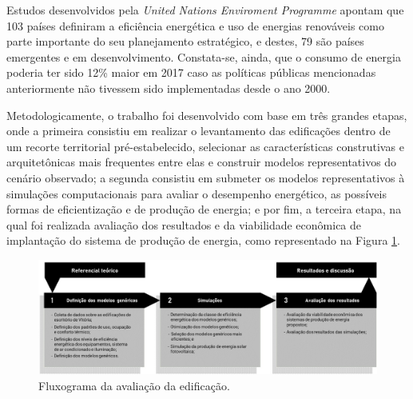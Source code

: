 \begin{onehalfspace}
    \noindent Estudos desenvolvidos pela \textit{United Nations Enviroment Programme}
    apontam que 103 países definiram a eficiência energética e uso de energias 
    renováveis como parte importante do seu planejamento estratégico, e destes, 
    79 são países emergentes e em desenvolvimento. Constata-se, ainda, que o 
    consumo de energia poderia ter sido 12\% maior em 2017 caso as políticas 
    públicas mencionadas anteriormente não tivessem sido implementadas desde o ano 2000.\vspace*{0.3cm}

    \noindent 

    \noindent Metodologicamente, o trabalho foi desenvolvido com base em três 
    grandes etapas, onde a primeira consistiu em realizar o levantamento das edificações 
    dentro de um recorte territorial pré-estabelecido, selecionar as características 
    construtivas e arquitetônicas mais frequentes entre elas e construir modelos 
    representativos do cenário observado; a segunda consistiu em submeter os modelos
    representativos à simulações computacionais para avaliar o desempenho energético, 
    as possíveis formas de eficientização e de produção de energia; e por fim, a 
    terceira etapa, na qual foi realizada avaliação dos resultados e da viabilidade 
    econômica de implantação do sistema de produção de energia, como representado 
    na Figura \ref{fig:1}.\vspace*{0.3cm}
    \begin{figure}[H]
        \label{fig:1}
        \centering
        \includegraphics[width=1\textwidth]{figures/fig8_Fluxogramas_1.jpg}
        \caption{\small Fluxograma da avaliação da edificação.}
    \end{figure}


\end{onehalfspace}
